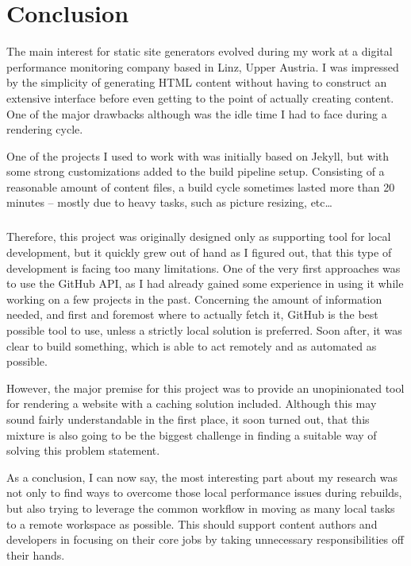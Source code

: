 \chapter{Conclusion}
\label{cha:conclusion}

The main interest for static site generators evolved during my work at a digital performance monitoring company based in Linz, Upper Austria. I was impressed by the simplicity of generating HTML content without having to construct an extensive interface before even getting to the point of actually creating content. One of the major drawbacks although was the idle time I had to face during a rendering cycle.

One of the projects I used to work with was initially based on Jekyll, but with some strong customizations added to the build pipeline setup. Consisting of a reasonable amount of content files, a build cycle sometimes lasted more than 20 minutes -- mostly due to heavy tasks, such as picture resizing, etc\ldots

\paragraph{}
Therefore, this project was originally designed only as supporting tool for local development, but it quickly grew out of hand as I figured out, that this type of development is facing too many limitations. One of the very first approaches was to use the GitHub API, as I had already gained some experience in using it while working on a few projects in the past. Concerning the amount of information needed, and first and foremost where to actually fetch it, GitHub is the best possible tool to use, unless a strictly local solution is preferred. Soon after, it was clear to build something, which is able to act remotely and as automated as possible.

However, the major premise for this project was to provide an unopinionated tool for rendering a website with a caching solution included. Although this may sound fairly understandable in the first place, it soon turned out, that this mixture is also going to be the biggest challenge in finding a suitable way of solving this problem statement.

As a conclusion, I can now say, the most interesting part about my research was not only to find ways to overcome those local performance issues during rebuilds, but also trying to leverage the common workflow in moving as many local tasks to a remote workspace as possible. This should support content authors and developers in focusing on their core jobs by taking unnecessary responsibilities off their hands.

